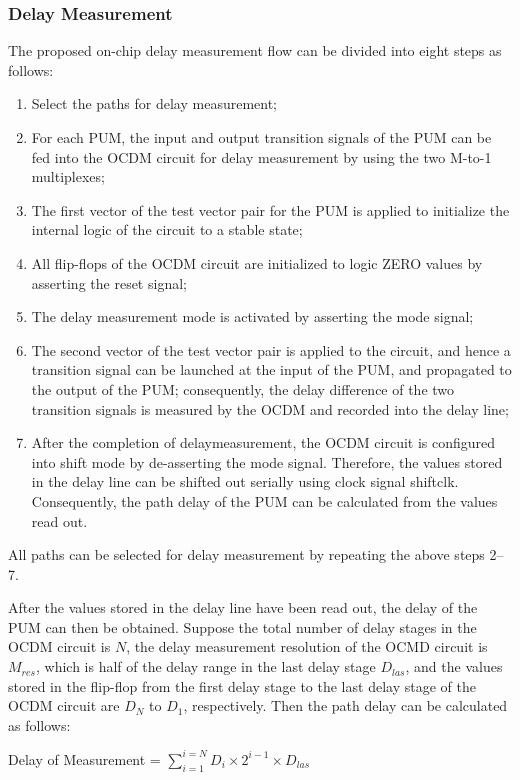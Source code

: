 \subsubsection{Delay Measurement}
The proposed on-chip delay measurement flow can be divided into eight steps as follows:
\begin{enumerate}[{1)}]
    \item Select the paths for delay measurement;
    \item For each PUM, the input and output transition signals of the PUM can be fed into the OCDM circuit for delay measurement by using the two M-to-1 multiplexes;
    \item The first vector of the test vector pair for the PUM is applied to initialize the internal logic of the circuit to a stable state; 
    \item All flip-flops of the OCDM circuit are initialized to logic ZERO values by asserting the reset signal; 
    \item The delay measurement mode is activated by asserting the mode signal; 
    \item The second vector of the test vector pair is applied to the circuit, and hence a transition signal can be launched at the input of the PUM, and propagated to the output of the PUM; consequently, the delay difference of the two transition signals is measured by the OCDM and recorded into the delay line; 
    \item After the completion of delaymeasurement, the OCDM circuit is configured into shift mode by de-asserting the mode signal. Therefore, the values stored in the delay line can be shifted out serially using clock signal shiftclk. Consequently, the path delay of the PUM can be calculated from the values read out.
\end{enumerate}

All paths can be selected for delay measurement by repeating the above steps 2–7.

After the values stored in the delay line have been read out, the delay of the PUM can then be obtained. Suppose the total number of delay stages in the OCDM circuit is $N$, the delay measurement resolution of the OCMD circuit is $M_{res}$, which is half of the delay range in the last delay stage $D_{las}$, and the values stored in the flip-flop from the first delay stage to the last delay stage of the OCDM circuit are $D_{N}$ to $D_{1}$, respectively. Then the path delay can be calculated as follows:


Delay of Measurement = $\sum_{i=1}^{i=N}D_{i} \times 2^{i-1}\times D_{las}$

